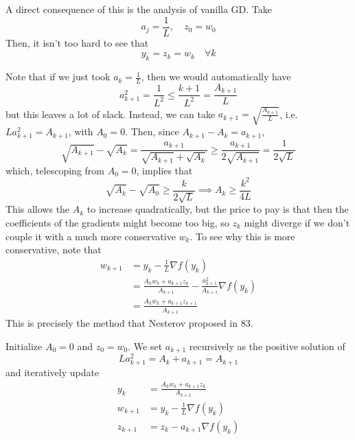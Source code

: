 	A direct consequence of this is the analysis of vanilla GD. Take 
	\begin{equation}
		a_j = \frac{1}{L}, \quad z_0 = w_0
	\end{equation}
	Then, it isn't too hard to see that 
	\begin{equation}
	  y_k = z_k = w_k \quad \forall k 
	\end{equation}

	Note that if we just took $a_k = \frac{1}{L}$, then we would automatically have 
	\begin{equation}
		a_{k+1}^2 = \frac{1}{L^2} \leq \frac{k+1}{L^2} = \frac{A_{k+1}}{L}
	\end{equation}
	but this leaves a lot of slack. Instead, we can take $a_{k+1} = \sqrt{\frac{A_{k+1}}{L}}$, i.e. $L a_{k+1}^2 = A_{k+1}$, with $A_0 = 0$. Then, since $A_{k+1} - A_k = a_{k+1}$, 
	\begin{equation}
		\sqrt{A_{k+1}} - \sqrt{A_k} = \frac{a_{k+1}}{\sqrt{A_{k+1}} + \sqrt{A_k}} \geq \frac{a_{k+1}}{2 \sqrt{A_{k+1}}} = \frac{1}{2 \sqrt{L}}
	\end{equation}
	which, telescoping from $A_0 = 0$, implies that 
	\begin{equation}
		\sqrt{A_{k}} - \sqrt{A_0} \geq \frac{k}{2\sqrt{L}} \implies A_{k} \geq \frac{k^2}{4L}
	\end{equation}
	This allows the $A_{k}$ to increase quadratically, but the price to pay is that then the coefficients of the gradients might become too big, so $z_k$ might diverge if we don't couple it with a much more conservative $w_k$. To see why this is more conservative, note that 
	\begin{align}
		w_{k+1} & = y_k - \frac{1}{L} \nabla f(y_k) \\ 
						& = \frac{A_k w_k + a_{k+1} z_k}{A_{k+1}} - \frac{a_{k+1}^2}{A_{k+1}} \nabla f(y_k) \\ 
						& = \frac{A_k w_k + a_{k+1} z_{k+1}}{A_{k+1}}
	\end{align}
	This is precisely the method that Nesterov proposed in 83. 

	\begin{definition}
	  \label{def:nesterov-accelerated-gradient-descent}
		Initialize $A_0 = 0$ and $z_0 = w_0$. We set $a_{k+1}$ recursively as the positive solution of 
		\begin{equation}
			L a_{k+1}^2 = A_k + a_{k+1} = A_{k+1}
		\end{equation}
		and iteratively update 
		\begin{align}
			y_k & = \frac{A_k w_k + a_{k+1} z_k}{A_{k+1}} \\ 
			w_{k+1} & = y_k - \frac{1}{L} \nabla f(y_k) \\ 
			z_{k+1} & = z_k - a_{k+1} \nabla f(y_k)
		\end{align}
	\end{definition}

